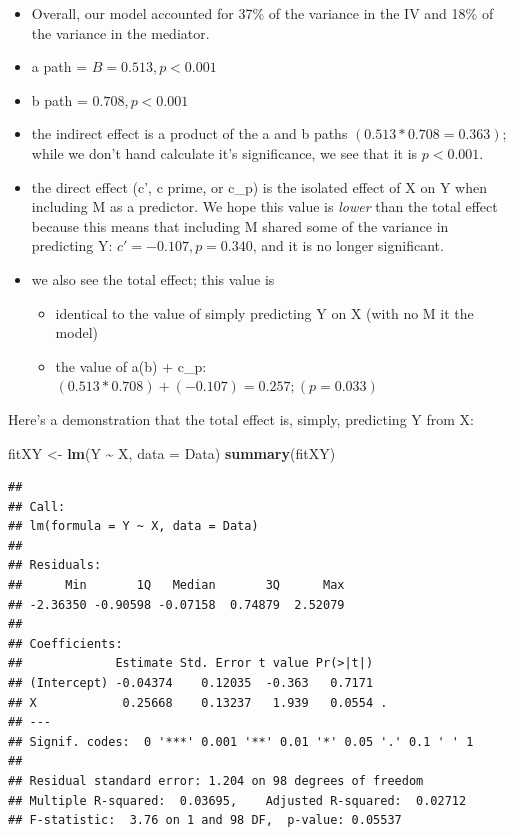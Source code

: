 \documentclass[
  11pt,
]{book}
\newenvironment{Shaded}{\begin{snugshade}}{\end{snugshade}}
\newcommand{\AttributeTok}[1]{\textcolor[rgb]{0.27,0.27,0.27}{#1}}
\newcommand{\FunctionTok}[1]{\textcolor[rgb]{0.27,0.27,0.27}{\textbf{#1}}}
\newcommand{\NormalTok}[1]{#1}
\newcommand{\OtherTok}[1]{\textcolor[rgb]{0.37,0.37,0.37}{#1}}
\newcommand{\SpecialCharTok}[1]{\textcolor[rgb]{0.43,0.43,0.43}{\textbf{#1}}}
\providecommand{\tightlist}{%
  \setlength{\itemsep}{0pt}\setlength{\parskip}{0pt}}
\begin{document}
\begin{itemize}
\tightlist
\item
  Overall, our model accounted for 37\% of the variance in the IV and 18\% of the variance in the mediator.
\item
  a path = \(B = 0.513, p < 0.001\)
\item
  b path = \(0.708, p < 0.001\)
\item
  the indirect effect is a product of the a and b paths \((0.513 * 0.708 = 0.363)\); while we don't hand calculate it's significance, we see that it is \(p < 0.001\).
\item
  the direct effect (c', c prime, or c\_p) is the isolated effect of X on Y when including M as a predictor. We hope this value is \emph{lower} than the total effect because this means that including M shared some of the variance in predicting Y: \(c' = -0.107, p = 0.340\), and it is no longer significant.
\item
  we also see the total effect; this value is

  \begin{itemize}
  \tightlist
  \item
    identical to the value of simply predicting Y on X (with no M it the model)
  \item
    the value of a(b) + c\_p: \((0.513 * 0.708) + (-0.107) = 0.257; (p = 0.033)\)
  \end{itemize}
\end{itemize}

Here's a demonstration that the total effect is, simply, predicting Y from X:

\begin{Shaded}
\begin{Highlighting}[]
\NormalTok{fitXY }\OtherTok{\textless{}{-}} \FunctionTok{lm}\NormalTok{(Y }\SpecialCharTok{\textasciitilde{}}\NormalTok{ X, }\AttributeTok{data =}\NormalTok{ Data)}
\FunctionTok{summary}\NormalTok{(fitXY)}
\end{Highlighting}
\end{Shaded}

\begin{verbatim}
## 
## Call:
## lm(formula = Y ~ X, data = Data)
## 
## Residuals:
##      Min       1Q   Median       3Q      Max 
## -2.36350 -0.90598 -0.07158  0.74879  2.52079 
## 
## Coefficients:
##             Estimate Std. Error t value Pr(>|t|)  
## (Intercept) -0.04374    0.12035  -0.363   0.7171  
## X            0.25668    0.13237   1.939   0.0554 .
## ---
## Signif. codes:  0 '***' 0.001 '**' 0.01 '*' 0.05 '.' 0.1 ' ' 1
## 
## Residual standard error: 1.204 on 98 degrees of freedom
## Multiple R-squared:  0.03695,    Adjusted R-squared:  0.02712 
## F-statistic:  3.76 on 1 and 98 DF,  p-value: 0.05537
\end{verbatim}
\end{document}
